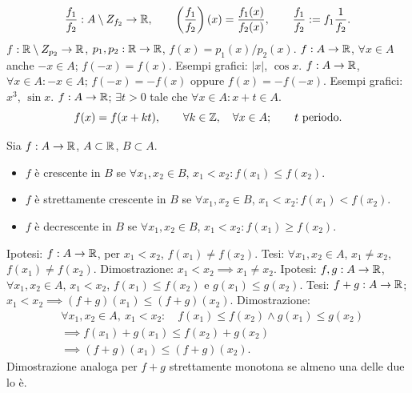 \[\frac{f_1}{f_2}:A\setminus Z_{f_2}\to\mathbb R,\qquad\left(\frac{f_1}{f_2}\right)(x)=\frac{f_1(x)}{f_2(x)},\qquad\frac{f_1}{f_2}:=f_1\frac1{f_2}.\]
$f:\mathbb R\setminus Z_{p_2}\to\mathbb R$, $p_1,p_2:\mathbb R\to\mathbb R$, $f(x)=p_1(x)/p_2(x)$.
$f:A\to\mathbb R$, $\forall x\in A$ anche $-x\in A$; $f(-x)=f(x)$.
Esempi grafici: $|x|$, $\cos x$.
$f:A\to\mathbb R$, $\forall x\in A:-x\in A$;
$f(-x)=-f(x)$ oppure $f(x)=-f(-x)$.
Esempi grafici: $x^3$, $\sin x$.
$f:A\to\mathbb R$; $\exists t>0$ tale che $\forall x\in A:x+t\in A$.
\[f(x)=f(x+kt),\qquad\forall k\in\mathbb Z,\quad\forall x\in A;\qquad t\text{ periodo}.\]
\begin{center}\end{center}
Sia $f:A\to\mathbb R$, $A\subset\mathbb R$, $B\subset A$.
\begin{itemize}\item $f$ è crescente in $B$ se $\forall x_1,x_2\in B$, $x_1<x_2:f(x_1)\le f(x_2)$.
\item $f$ è strettamente crescente in $B$ se $\forall x_1,x_2\in B$, $x_1<x_2:f(x_1)<f(x_2)$.
\item $f$ è decrescente in $B$ se $\forall x_1,x_2\in B$, $x_1<x_2:f(x_1)\ge f(x_2)$.
\end{itemize}
Ipotesi: $f:A\to\mathbb R$, per $x_1<x_2$, $f(x_1)\ne f(x_2)$.
Tesi: $\forall x_1,x_2\in A$, $x_1\ne x_2$, $f(x_1)\ne f(x_2)$.
Dimostrazione: $x_1<x_2\implies x_1\ne x_2$.
Ipotesi: $f,g:A\to\mathbb R$, $\forall x_1,x_2\in A$, $x_1<x_2$,
$f(x_1)\le f(x_2)$ e $g(x_1)\le g(x_2)$.
Tesi: $f+g:A\to\mathbb R$; $x_1<x_2\implies(f+g)(x_1)\le(f+g)(x_2)$.
Dimostrazione:
\begin{align*}&\forall x_1,x_2\in A,\ x_1<x_2:\quad f(x_1)\le f(x_2)\land g(x_1)\le g(x_2)\\
&\implies f(x_1)+g(x_1)\le f(x_2)+g(x_2)\\
&\implies(f+g)(x_1)\le(f+g)(x_2).
\end{align*}
Dimostrazione analoga per $f+g$ strettamente monotona se almeno una delle due lo è.

